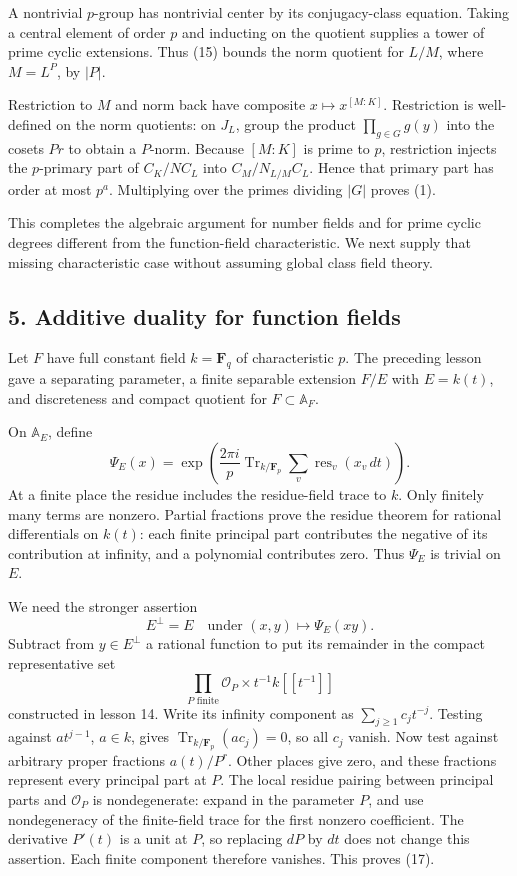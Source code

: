 \documentclass[11pt,a4paper]{article}
\begin{document}
A nontrivial \(p\)-group has nontrivial center by its conjugacy-class
equation. Taking a central element of order \(p\) and inducting on the
quotient supplies a tower of prime cyclic extensions. Thus (15) bounds
the norm quotient for \(L/M\), where \(M=L^P\), by \(|P|\).

Restriction to \(M\) and norm back have composite
\(x\mapsto x^{[M:K]}\). Restriction is well-defined on the norm
quotients: on \(J_L\), group the product \(\prod_{g\in G}g(y)\) into the
cosets \(Pr\) to obtain a \(P\)-norm. Because \([M:K]\) is prime to
\(p\), restriction injects the \(p\)-primary part of \(C_K/NC_L\) into
\(C_M/N_{L/M}C_L\). Hence that primary part has order at most \(p^a\).
Multiplying over the primes dividing \(|G|\) proves (1).

This completes the algebraic argument for number fields and for prime
cyclic degrees different from the function-field characteristic. We next
supply that missing characteristic case without assuming global class
field theory.

\subsection{5. Additive duality for function
fields}\label{additive-duality-for-function-fields}

Let \(F\) have full constant field \(k=\mathbf F_q\) of characteristic
\(p\). The preceding lesson gave a separating parameter, a finite
separable extension \(F/E\) with \(E=k(t)\), and discreteness and
compact quotient for \(F\subset\mathbb A_F\).

On \(\mathbb A_E\), define \[
\Psi_E(x)=
\exp\left(\frac{2\pi i}{p}
\operatorname{Tr}_{k/\mathbf F_p}
\sum_v\operatorname{res}_v(x_v\,dt)\right).
\tag{16}
\] At a finite place the residue includes the residue-field trace to
\(k\). Only finitely many terms are nonzero. Partial fractions prove the
residue theorem for rational differentials on \(k(t)\): each finite
principal part contributes the negative of its contribution at infinity,
and a polynomial contributes zero. Thus \(\Psi_E\) is trivial on \(E\).

We need the stronger assertion \[
E^\perp=E
\quad\text{under }(x,y)\longmapsto\Psi_E(xy).
\tag{17}
\] Subtract from \(y\in E^\perp\) a rational function to put its
remainder in the compact representative set \[
\prod_{P\text{ finite}}\mathcal O_P\times t^{-1}k[[t^{-1}]]
\] constructed in lesson 14. Write its infinity component as
\(\sum_{j\geq1}c_jt^{-j}\). Testing against \(a t^{j-1}\), \(a\in k\),
gives \(\operatorname{Tr}_{k/\mathbf F_p}(a c_j)=0\), so all \(c_j\)
vanish. Now test against arbitrary proper fractions \(a(t)/P^r\). Other
places give zero, and these fractions represent every principal part at
\(P\). The local residue pairing between principal parts and
\(\mathcal O_P\) is nondegenerate: expand in the parameter \(P\), and
use nondegeneracy of the finite-field trace for the first nonzero
coefficient. The derivative \(P'(t)\) is a unit at \(P\), so replacing
\(dP\) by \(dt\) does not change this assertion. Each finite component
therefore vanishes. This proves (17).
\end{document}
